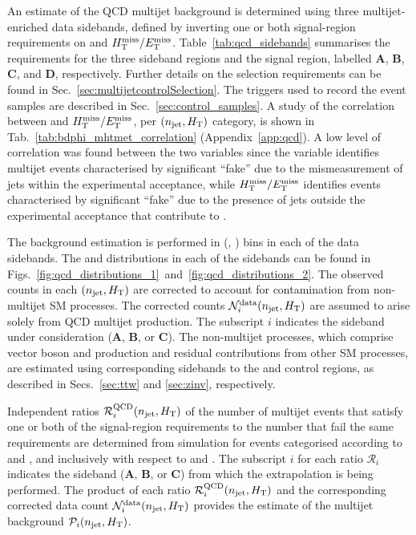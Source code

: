 An estimate of the QCD multijet background is determined using three
multijet-enriched data sidebands, defined by inverting one or both
signal-region requirements on \bdphi and
$\mbox{$H_{\rm T}^{\rm miss}$}/\mbox{$E_\text{T}^{\rm miss}$}$. Table~\ref{tab:qcd_sidebands} summarises the requirements
for the three sideband regions and the signal region, labelled
\textbf{A}, \textbf{B}, \textbf{C}, and \textbf{D},
respectively. Further details on the selection requirements can be
found in Sec.~\ref{sec:multijetcontrolSelection}. The triggers used to
record the event samples are described in
Sec.~\ref{sec:control_samples}. A study of the correlation between
\bdphi and $\mbox{$H_{\rm T}^{\rm miss}$}/\mbox{$E_\text{T}^{\rm miss}$}$, per $(n_{\text{jet}}, \mbox{$H_\text{T}$})$ category, is shown in
Tab.~\ref{tab:bdphi_mhtmet_correlation} (Appendix~\ref{app:qcd}). A
low level of correlation was found between the two variables since the
\bdphi variable identifies multijet events characterised by
significant ``fake'' \met due to the mismeasurement of jets within the
experimental acceptance, while $\mbox{$H_{\rm T}^{\rm miss}$}/\mbox{$E_\text{T}^{\rm miss}$}$ identifies events
characterised by significant ``fake'' \met due to the presence of jets
outside the experimental acceptance that contribute to \mht. 

The background estimation is performed in (\njet, \scalht) bins in
each of the data sidebands. The \njet and \scalht distributions in
each of the sidebands can be found in
Figs.~\ref{fig:qcd_distributions_1}~and~\ref{fig:qcd_distributions_2}.
The observed counts in each $(n_{\text{jet}}, \mbox{$H_\text{T}$})$ are corrected to
account for contamination from non-multijet SM processes. The
corrected counts $\mathcal{N}_i^\text{data}(n_{\text{jet}}, \mbox{$H_\text{T}$})$ are
assumed to arise solely from QCD multijet production. The subscript
$i$ indicates the sideband under consideration (\textbf{A},
\textbf{B}, or \textbf{C}). The non-multijet processes, which comprise
vector boson and \ttbar production and residual contributions from
other SM processes, are estimated using corresponding sidebands to the
\mj and \mmj control regions, as described in Secs.~\ref{sec:ttw} and
\ref{sec:zinv}, respectively.

Independent ratios $\mathcal{R}_i^\mathrm{QCD}(n_{\text{jet}}, \mbox{$H_\text{T}$})$ of the
number of multijet events that satisfy one or both of the
signal-region requirements to the number that fail the same
requirements are determined from simulation for events categorised
according to \njet and \scalht, and inclusively with respect to \nb
and \HTmiss. The subscript $i$ for each ratio $\mathcal{R}_i$
indicates the sideband (\textbf{A}, \textbf{B}, or \textbf{C}) from
which the extrapolation is being performed. The product of each ratio
$\mathcal{R}_i^\mathrm{QCD}(n_{\text{jet}}, \mbox{$H_\text{T}$})$ and the corresponding
corrected data count $\mathcal{N}_i^\text{data}(n_{\text{jet}}, \mbox{$H_\text{T}$})$
provides the estimate of the multijet background $\mathcal{P}_i(n_{\text{jet}},
\mbox{$H_\text{T}$})$. 


